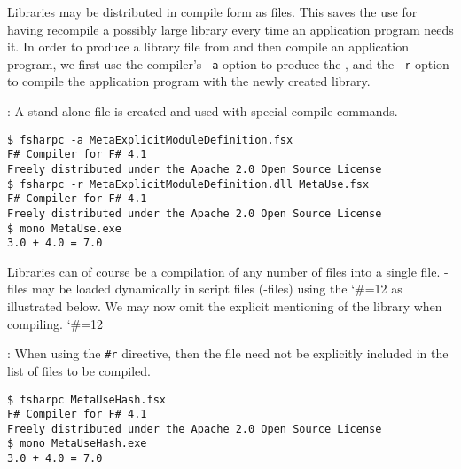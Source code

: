 Libraries may be distributed in compile form as  files. This saves the use for having recompile a possibly large library every time an application program needs it. In order to produce a library file from  and then compile an application program, we first use the compiler's \lstinline[language=console]{-a} option to produce the , and the \lstinline[language=console]{-r} option to compile the application program with the newly created library.
\begin{codeNOutput}{: A stand-alone  file is created and used with special compile commands.}
\begin{lstlisting}[language=console,escapechar=§]
$ fsharpc -a MetaExplicitModuleDefinition.fsx
F# Compiler for F# 4.1
Freely distributed under the Apache 2.0 Open Source License
$ fsharpc -r MetaExplicitModuleDefinition.dll MetaUse.fsx 
F# Compiler for F# 4.1
Freely distributed under the Apache 2.0 Open Source License
$ mono MetaUse.exe 
3.0 + 4.0 = 7.0
\end{lstlisting}%
\end{codeNOutput}
Libraries can of course be a compilation of any number of files into a single  file. -files may be loaded dynamically in script files (-files) using the 
\begingroup %
\catcode`\#=12
\endgroup
as illustrated below.
%
%
We may now omit the explicit mentioning of the library when compiling.
\begingroup %
\catcode`\#=12
\begin{codeNOutput}{: When using the \lstinline{#r} directive, then the  file need not be explicitly included in the list of files to be compiled.}
\begin{lstlisting}[language=console,escapechar=§]
$ fsharpc MetaUseHash.fsx 
F# Compiler for F# 4.1
Freely distributed under the Apache 2.0 Open Source License
$ mono MetaUseHash.exe 
3.0 + 4.0 = 7.0
\end{lstlisting}
\end{codeNOutput}

